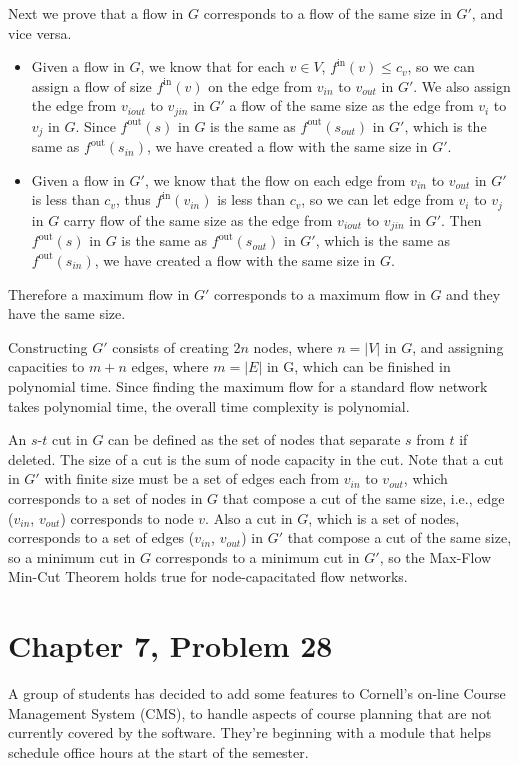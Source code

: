 \documentclass[12pt,letterpaper]{article}
\begin{document}
Next we prove that a flow in $G$ corresponds to a flow of the same size in $G'$, and vice versa.
\begin{itemize}
\item Given a flow in $G$, we know that for each $v\in V$, $f^{\textrm{in}}(v)\le c_v$, so we can assign a flow of size $f^{\textrm{in}}(v)$ on the edge from $v_{in}$ to $v_{out}$ in $G'$. We also assign the edge from $v_{iout}$ to $v_{jin}$ in $G'$ a flow of the same size as the edge from $v_i$ to $v_j$ in $G$. Since $f^{\textrm{out}}(s)$ in $G$ is the same as $f^{\textrm{out}}(s_{out})$ in $G'$, which is the same as $f^{\textrm{out}}(s_{in})$, we have created a flow with the same size in $G'$.
\item Given a flow in $G'$, we know that the flow on each edge from $v_{in}$ to $v_{out}$ in $G'$ is less than $c_v$, thus $f^{\textrm{in}}(v_{in})$ is less than $c_v$, so we can let edge from $v_i$ to $v_j$ in $G$ carry flow of the same size as the edge from $v_{iout}$ to $v_{jin}$ in $G'$. Then $f^{\textrm{out}}(s)$ in $G$ is the same as $f^{\textrm{out}}(s_{out})$ in $G'$, which is the same as $f^{\textrm{out}}(s_{in})$, we have created a flow with the same size in $G$.
\end{itemize}
Therefore a maximum flow in $G'$ corresponds to a maximum flow in $G$ and they have the same size.

Constructing $G'$ consists of creating $2n$ nodes, where $n = |V|$ in $G$, and assigning capacities to $m+n$ edges, where $m = |E|$ in G, which can be finished in polynomial time. Since finding the maximum flow for a standard flow network takes polynomial time, the overall time complexity is polynomial.

An $s$-$t$ cut in $G$ can be defined as the set of nodes that separate $s$ from $t$ if deleted. The size of a cut is the sum of node capacity in the cut. Note that a cut in $G'$ with finite size must be a set of edges each from $v_{in}$ to $v_{out}$, which corresponds to a set of nodes in $G$ that compose a cut of the same size, i.e., edge ($v_{in}$, $v_{out}$) corresponds to node $v$. Also a cut in $G$, which is a set of nodes, corresponds to a set of edges ($v_{in}$, $v_{out}$) in $G'$ that compose a cut of the same size, so a minimum cut in $G$ corresponds to a minimum cut in $G'$, so the Max-Flow Min-Cut Theorem holds true for node-capacitated flow networks.

\section*{Chapter 7, Problem 28}
A group of students has decided to add some features to Cornell's on-line
Course Management System (CMS), to handle aspects of course planning
that are not currently covered by the software. They're beginning with a
module that helps schedule office hours at the start of the semester.
\end{document}
